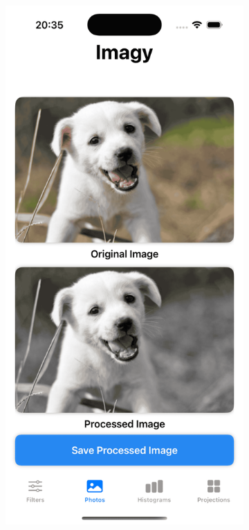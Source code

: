 \documentclass[a4paper]{article}
\begin{document}
\begin{figure}[H]
\begin{subfigure}{0.2\textwidth}
        \includegraphics[width=\linewidth]{images/dog_gray.png}

\end{subfigure}
\end{figure}
\end{document}
